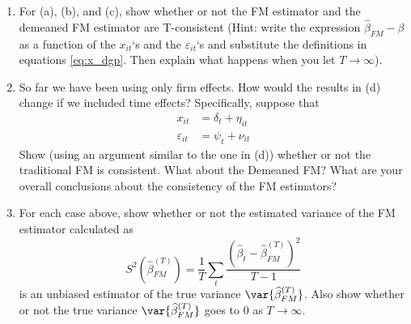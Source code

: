 \begin{enumerate}[label = (\alph*)]
\item For (a), (b), and (c), show whether or not the FM estimator and the demeaned FM estimator are T-consistent (Hint: write the expression \(\widehat\beta_{FM}-\beta\) as a function of the \(x_{it}\)`s and the \(\varepsilon_{it}\)`s and substitute the definitions in equations \ref{eq:x_dgp}. Then explain what happens when you let \(T \to \infty\)).

\item So far we have been using only firm effects. How would the results in (d) change if we included time effects? Specifically, suppose that
\begin{align*}
    x_{it} & = \delta_t+\eta_{it} \\
    \varepsilon_{it} & = \psi_t+\nu_{it}
\end{align*}
Show (using an argument similar to the one in (d)) whether or not the traditional FM is consistent. What about the Demeaned FM? What are your overall conclusions about the consistency of the FM estimators?

\item For each case above, show whether or not the estimated variance of the FM estimator calculated as 
\[
    S^2\left(\widehat\beta^{(T)}_{FM}\right) = \frac{1}{T} \sum_t \frac{\left(\widehat\beta_t-\widehat\beta_{FM}^{(T)}\right)^2}{T-1}
\]
is an unbiased estimator of the true variance \(\var{\widehat\beta_{FM}^{(T)}}\). Also show whether or not the true variance \(\var{\widehat\beta^{(T)}_{FM}}\) goes to 0 as \(T \to \infty\).
\end{enumerate}
